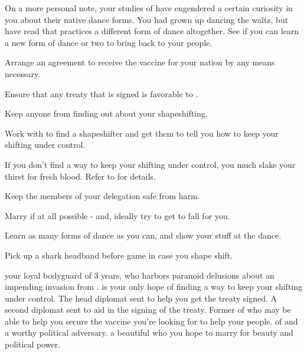 \documentclass[char]{NeptuneBall}
\begin{document}
On a more personal note, your studies of \pAtlantis{} have engendered a certain curiosity in you about their native dance forms. You had grown up dancing the waltz, but have read that \pAtlantis{} practices a different form of dance altogether. See if you can learn a new form of dance or two to bring back to your people.

\begin{itemz}[Goals]
  \item Arrange an agreement to receive the \ppolio{} vaccine for your nation by any means necessary.
	\item Ensure that any treaty that is signed is favorable to \pPacifica{}.
	\item Keep anyone from finding out about your shapeshifting.
	\item Work with \cBodyguard{} to find a shapeshifter and get them to tell you how to keep your shifting under control.
	\item If you don't find a way to keep your shifting under control, you much slake your thirst for fresh blood. Refer to \aBloodthirsty{} for details. 
	\item Keep the members of your delegation safe from harm.
	\item Marry \cPrincess{} if at all possible - and, ideally try to get \cPrincess{\them} to fall for you.
	\item Learn as many forms of dance as you can, and show your stuff at the dance.
\end{itemz}

\begin{itemz}[Notes]
  \item Pick up a shark headband before game in case you shape shift.
\end{itemz}

\begin{contacts}
  \contact{\cBodyguard{}} your loyal bodyguard of 3 years, who harbors paranoid delusions about an impending invasion from \pIndia{}. \cBodyguard{\They} is your only hope of finding a way to keep your shifting under control.
	\contact{\cDiplomat{}} The head diplomat sent to help you get the treaty signed.
	\contact{\cSpy{}} A second diplomat sent to aid in the signing of the treaty.
	\contact{\cAriel{}} Former \cAriel{\Prince} of \pAtlantis{} who may be able to help you secure the vaccine you're looking for to help your people.
	\contact{\cKing{}} \cKing{\King} of \pAtlantis{} and a worthy political adversary.
	\contact{\cPrincess{}} a beautiful \cPrincess{\Prince} who you hope to marry for \cPrincess{\them} beauty and political power.
\end{contacts}
\end{document}
